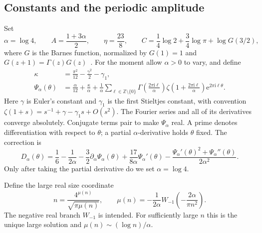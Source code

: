 \documentclass[11pt,a4paper]{article}
\numberwithin{equation}{section}
\theoremstyle{definition}
\theoremstyle{remark}
\newcommand{\Z}{\mathbb Z}
\newcommand{\ii}{\mathrm i}
\newcommand{\e}{\mathrm e}
\begin{document}
\subsection{Constants and the periodic amplitude}
Set
\begin{equation}\label{ctp:eq:constants}
 \alpha=\log4,\qquad A=\frac{1+3\alpha}{2},\qquad
 \eta=\frac{23}{8},\qquad
 C=\frac14\log2+\frac34\log\pi+\log G(3/2),
\end{equation}
where $G$ is the Barnes function, normalized by $G(1)=1$ and
$G(z+1)=\Gamma(z)G(z)$~\cite{dlmfG}.
For the moment allow $\alpha>0$ to vary, and define
\begin{align}
 \kappa&=\frac{\pi^2}{12}-\frac{\gamma^2}{2}-\gamma_1,
       \label{ctp:eq:kappa}\\
 \Psi_\alpha(\theta)
 &=\frac\alpha{12}+\frac\kappa\alpha+
 \frac1\alpha\sum_{\ell\in\Z\setminus\{0\}}
 \Gamma\!\left(\frac{2\pi\ii\ell}{\alpha}\right)
 \zeta\!\left(1+\frac{2\pi\ii\ell}{\alpha}\right)
 \e^{2\pi\ii\ell\theta}.\label{ctp:eq:phase-fourier}
\end{align}
Here $\gamma$ is Euler's constant and $\gamma_1$ is the first Stieltjes
constant, with convention
$\zeta(1+s)=s^{-1}+\gamma-\gamma_1s+O(s^2)$.
The Fourier series and all of its derivatives converge absolutely.
Conjugate terms pair to make $\Psi_\alpha$ real.
A prime denotes differentiation with respect to $\theta$; a partial
$\alpha$-derivative holds $\theta$ fixed. The correction is
\begin{equation}\label{ctp:eq:D}
\boxed{\displaystyle
 D_\alpha(\theta)=\frac16-\frac1{2\alpha}
 -\frac32\partial_\alpha\Psi_\alpha(\theta)
 +\frac{17}{8\alpha}\Psi_\alpha'(\theta)
 -\frac{\Psi_\alpha'(\theta)^2+\Psi_\alpha''(\theta)}{2\alpha^2}.}
\end{equation}
Only after taking the partial derivative do we set $\alpha=\log4$.

Define the large real size coordinate
\begin{equation}\label{ctp:eq:mu}
 n=\frac{4^{\mu(n)}}{\sqrt{\pi\mu(n)}},\qquad
 \mu(n)=-\frac1{2\alpha}W_{-1}\!\left(-\frac{2\alpha}{\pi n^2}\right).
\end{equation}
The negative real branch $W_{-1}$ is intended. For sufficiently large $n$
this is the unique large solution and $\mu(n)\sim(\log n)/\alpha$.
\end{document}
